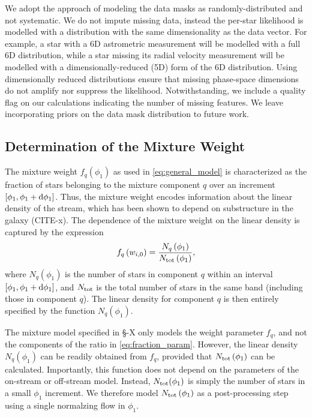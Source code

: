 \documentclass[twocolumn]{aastex631}
\begin{document}
        We adopt the approach of modeling the data masks as randomly-distributed
        and not systematic. We do not impute missing data, instead the per-star
        likelihood is modelled with a distribution with the same dimensionality
        as the data vector.  For example, a star with a 6D astrometric
        measurement will be modelled with a full 6D distribution, while a star
        missing its radial velocity measurement will be modelled with a
        dimensionally-reduced (5D) form of the 6D distribution. Using
        dimensionally reduced distributions ensure that missing phase-space
        dimensions do not amplify nor suppress the likelihood.  Notwithstanding,
        we include a quality flag on our calculations indicating the number of
        missing features.  We leave incorporating priors on the data mask
        distribution to future work. 


    \vspace{10pt}
    \subsection{Determination of the Mixture Weight} \label{sub:method:mixture_weight}

        The mixture weight $f_q(\phi_1)$ as used in \autoref{eq:general_model}
        is characterized as the fraction of stars belonging to the mixture
        component $q$ over an increment $[\phi_1, \phi_1 + \dif{\phi_1}]$. Thus,
        the mixture weight encodes information about the linear density of the
        stream, which has been shown to depend on substructure in the galaxy
        (CITE-x). The dependence of the mixture weight on the linear density is
        captured by the expression
        \begin{equation}\label{eq:fraction_param}
            f_q\left(w_{i,0}\right) = \frac{N_q\left(\phi_1\right)}{N_{\rm tot}\left(\phi_1\right)},
        \end{equation}
        where $N_q\left(\phi_1\right)$ is the number of stars in component $q$
        within an interval $[\phi_1, \phi_1 + \dif{\phi_1}]$, and $N_{\rm tot}$
        is the total number of stars in the same band (including those in
        component $q$). The linear  density for component $q$ is then entirely
        specified by the function $N_q(\phi_1)$.

        The mixture model specified in \S-X only models the weight parameter
        $f_q$, and not the components of the ratio in
        \autoref{eq:fraction_param}. However, the linear density $N_q(\phi_1)$
        can be readily obtained from $f_q$, provided that $N_{\rm
        tot}\left(\phi_1\right)$ can be calculated. Importantly, this function
        does not depend on the parameters of the on-stream or off-stream model.
        Instead, $N_{\rm tot}(\phi_1)$ is simply the number of stars in a small
        $\phi_1$ increment. We therefore model $N_{\rm tot}\left(\phi_1\right)$
        as a post-processing step using a single normalzing flow in $\phi_1$. 
\end{document}

